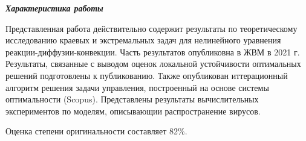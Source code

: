 \documentclass[12pt, a4paper, titlepage]{extarticle}
\begin{document}
	\textbf{\textit{Характеристика работы}}

		Представленная работа действительно содержит результаты по теоретическому исследованию краевых и экстремальных задач для нелинейного уравнения реакции-диффузии-конвекции. Часть результатов опубликовна в ЖВМ в 2021 г. Результаты, связанные с выводом оценок локальной устойчивости оптимальных решений подготовлены к публикованию. Также опубликован иттерационный алгоритм решения задачи управления, построенный на основе системы оптимальности (Scopus). Представлены результаты вычислительных экспериментов по моделям, описывающии распространение вирусов.

		Оценка степени оригинальности составляет 82\%.










\end{document}
